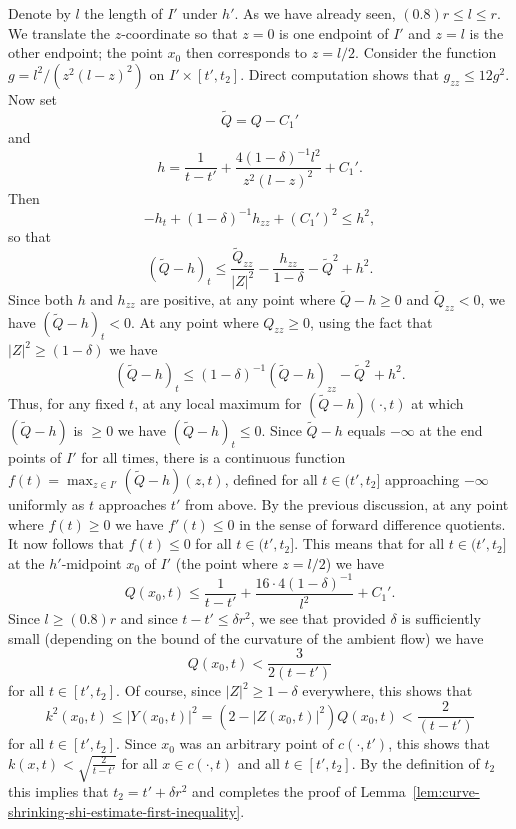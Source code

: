 Denote by $l$ the length of $I'$ under $h'$. As we have already
seen, $(0.8)r\le l\le r$. We translate the $z$-coordinate so that
$z=0$ is one endpoint of $I'$ and $z=l$ is the other endpoint; the
point $x_0$ then corresponds to $z=l/2$. Consider the function
$g=l^2/(z^2(l-z)^2)$ on $I'\times [t',t_2]$. Direct computation
shows that $g_{zz}\le 12g^2$.
 Now set
$$\widetilde Q=Q-C_1'$$
 and
$$h=\frac{1}{t-t'}+\frac{4(1-\delta)^{-1}l^2}{z^2(l-z)^2}+C_1'.$$
 Then
$$ -h_t+(1-\delta)^{-1}h_{zz}+(C_1')^2\le h^2,$$
so that
$$(\widetilde Q-h)_t\le \frac{\widetilde Q_{zz}}{|Z|^2}-\frac{h_{zz}}{1-\delta}-\widetilde
Q^2+h^2.$$ Since both $h$ and $h_{zz}$ are positive, at any point
where $\widetilde Q -h\ge 0$ and $\widetilde Q_{zz}<0$, we have
$(\widetilde Q-h)_t<0$. At any point where $Q_{zz}\ge 0$, using the
fact that $|Z|^2\ge (1-\delta)$ we have
$$(\widetilde Q-h)_t\le (1-\delta)^{-1}(\widetilde Q-h)_{zz}-\widetilde
Q^2+h^2.$$ Thus, for any fixed $t$, at any local maximum for
$(\widetilde Q-h)(\cdot,t)$ at which $(\widetilde Q-h)$ is $\ge 0$
we have $(\widetilde Q-h)_t\le 0$. Since $\widetilde Q-h$ equals
$-\infty$ at the end points of $I'$ for all times, there is a
continuous function $f(t)=\max_{z\in I'}(\widetilde Q-h)(z,t)$,
defined for all $t\in (t',t_2]$ approaching $-\infty$ uniformly as
$t$ approaches $t'$ from above. By the previous discussion, at any
point where $f(t)\ge 0$ we have $f'(t)\le 0$ in the sense of forward
difference quotients. It now follows that $f(t)\le 0$ for all $t\in
(t',t_2]$.
 This means that for all $t\in (t',t_2]$ at the $h'$-midpoint $x_0$ of
$I'$ (the point where $z=l/2$) we have
$$Q(x_0,t)\le \frac{1}{t-t'}+\frac{16\cdot 4(1-\delta)^{-1}}{l^2}+C_1'.$$
Since $l\ge (0.8)r$ and since $t-t'\le \delta r^2$, we see that
provided $\delta$ is sufficiently small (depending on the bound of
the curvature of the ambient flow) we have
$$Q(x_0,t)< \frac{3}{2(t-t')}$$ for all $t\in [t',t_2].$
Of course, since $|Z|^2\ge 1-\delta$ everywhere, this shows that
$$k^2(x_0,t)\le |Y(x_0,t)|^2=
(2-|Z(x_0,t)|^2)Q(x_0,t)< \frac{2}{(t-t')}$$ for all $t\in
[t',t_2]$. Since $x_0$ was an arbitrary point of $c(\cdot,t')$,
 this shows that
 $k(x,t)<\sqrt{\frac{2}{t-t'}}$ for all $x\in c(\cdot,t)$ and all $t\in
 [t',t_2]$. By the definition of $t_2$ this implies that $t_2=t'+\delta r^2$ and completes the
 proof of  Lemma~\ref{lem:curve-shrinking-shi-estimate-first-inequality}.
